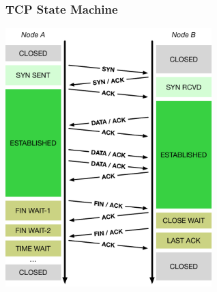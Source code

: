 \documentclass[pdftex]{beamer} %
\begin{document}
\begin{frame}[fragile]
  \frametitle{TCP State Machine}
\centering
\includegraphics[width=0.6\textwidth]{../../figures/tcp-timeline.pdf}
\end{frame}
\end{document}
